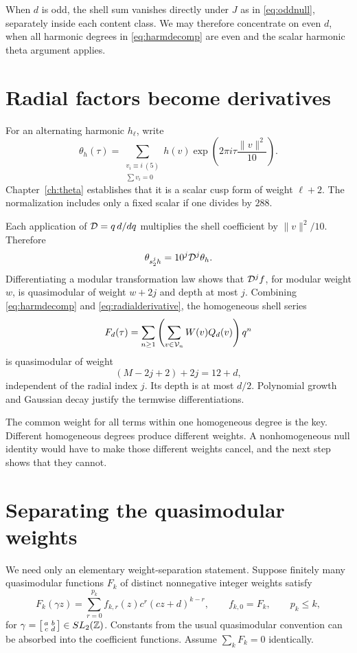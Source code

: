 When $d$ is odd, the shell sum vanishes directly under $J$ as in \eqref{eq:oddnull}, separately inside each content class. We may therefore concentrate on even $d$, when all harmonic degrees in \eqref{eq:harmdecomp} are even and the scalar harmonic theta argument applies.

\section{Radial factors become derivatives}
For an alternating harmonic $h_\ell$, write
\[
\theta_h(\tau)=\sum_{\substack{v_i\equiv i\ (5)\\\sum v_i=0}}
h(v)\exp\left(2\pi i\tau\frac{\|v\|^2}{10}\right).
\]
Chapter~\ref{ch:theta} establishes that it is a scalar cusp form of weight $\ell+2$. The normalization includes only a fixed scalar if one divides by $288$.

Each application of $\mathcal D=q\,d/dq$ multiplies the shell coefficient by $\|v\|^2/10$. Therefore
\begin{equation}\label{eq:radialderivative}
\theta_{s_2^jh}=10^j\mathcal D^j\theta_h.
\end{equation}
Differentiating a modular transformation law shows that $\mathcal D^jf$, for modular weight $w$, is quasimodular of weight $w+2j$ and depth at most $j$. Combining \eqref{eq:harmdecomp} and \eqref{eq:radialderivative}, the homogeneous shell series
\[
F_d(\tau)=\sum_{n\ge1}\left(\sum_{v\in\mathcal V_n}W(v)Q_d(v)\right)q^n
\]
is quasimodular of weight
\[
(M-2j+2)+2j=12+d,
\]
independent of the radial index $j$. Its depth is at most $d/2$. Polynomial growth and Gaussian decay justify the termwise differentiations.

The common weight for all terms within one homogeneous degree is the key. Different homogeneous degrees produce different weights. A nonhomogeneous null identity would have to make those different weights cancel, and the next step shows that they cannot.

\section{Separating the quasimodular weights}
We need only an elementary weight-separation statement. Suppose finitely many quasimodular functions $F_k$ of distinct nonnegative integer weights satisfy
\[
F_k(\gamma z)=\sum_{r=0}^{p_k}f_{k,r}(z)c^r(cz+d)^{k-r},
\qquad f_{k,0}=F_k,\qquad p_k\le k,
\]
for $\gamma=\left[\begin{smallmatrix}a&b\\c&d\end{smallmatrix}\right]\in SL_2(\mathbb Z)$. Constants from the usual quasimodular convention can be absorbed into the coefficient functions. Assume $\sum_kF_k=0$ identically.

